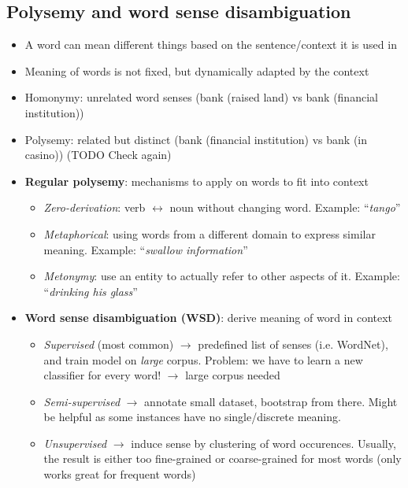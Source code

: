 \subsection{Polysemy and word sense disambiguation}
\begin{itemize}
	\item A word can mean different things based on the sentence/context it is used in
	\item Meaning of words is not fixed, but dynamically adapted by the context
	\item Homonymy: unrelated word senses (bank (raised land) vs bank (financial institution))
	\item Polysemy: related but distinct (bank (financial institution) vs bank (in casino)) (TODO Check again)
	\item \textbf{Regular polysemy}: mechanisms to apply on words to fit into context
	\begin{itemize}
		\item \textit{Zero-derivation}: verb $\leftrightarrow$ noun without changing word. Example: ``\textit{tango}''
		\item \textit{Metaphorical}: using words from a different domain to express similar meaning. Example: ``\textit{swallow information}''
		\item \textit{Metonymy}: use an entity to actually refer to other aspects of it. 
		Example: ``\textit{drinking his glass}''
	\end{itemize}
	\item \textbf{Word sense disambiguation (WSD)}: derive meaning of word in context
	\begin{itemize}
		\item \textit{Supervised} (most common) $\to$ predefined list of senses (i.e. WordNet), and train model on \textit{large} corpus. Problem: we have to learn a new classifier for every word! $\rightarrow$ large corpus needed
		\item \textit{Semi-supervised} $\to$ annotate small dataset, bootstrap from there. Might be helpful as some instances have no single/discrete meaning.
		\item \textit{Unsupervised} $\to$ induce sense by clustering of word occurences. Usually, the result is either too fine-grained or coarse-grained for most words (only works great for frequent words)
	\end{itemize}
\end{itemize}
